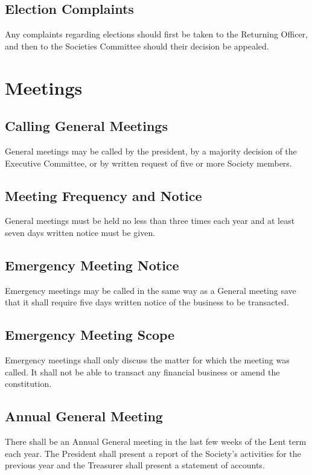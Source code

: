 \documentclass[11pt,a4paper]{article}
\begin{document}
\subsection{Election Complaints}
Any complaints regarding elections should first be taken to the Returning Officer, and then to the Societies Committee should their decision be appealed.

\section{Meetings}\label{sec:meetings}
\subsection{Calling General Meetings}
General meetings may be called by the president, by a majority decision of the Executive Committee, or by written request of five or more Society members.

\subsection{Meeting Frequency and Notice}
General meetings must be held no less than three times each year and at least seven days written notice must be given.

\subsection{Emergency Meeting Notice}
Emergency meetings may be called in the same way as a General meeting save that it shall require five days written notice of the business to be transacted.

\subsection{Emergency Meeting Scope}
Emergency meetings shall only discuss the matter for which the meeting was called. It shall not be able to transact any financial business or amend the constitution.

\subsection{Annual General Meeting}
There shall be an Annual General meeting in the last few weeks of the Lent term each year. The President shall present a report of the Society's activities for the previous year and the Treasurer shall present a statement of accounts.
\end{document}
